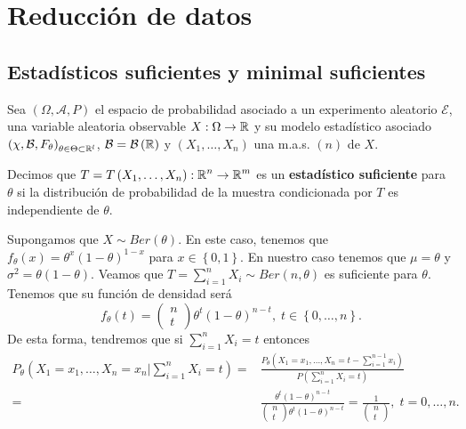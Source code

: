 \chapter{Reducción de datos}
\section{Estadísticos suficientes y minimal suficientes}

Sea $\displaystyle \left(\Omega, \mathcal{A}, P \right) $ el espacio de probabilidad asociado a un experimento aleatorio $\displaystyle \mathcal{E} $, una variable aleatoria observable $\displaystyle X : \Omega \to \mathbb{R} $ y su modelo estadístico asociado $\displaystyle \left(\chi, \mathcal{B}, F_{\theta }\right)_{\theta \in \Theta \subset \mathbb{R}^{l}} $, $\displaystyle \mathcal{B}=\mathcal{B}\left(\mathbb{R}\right) $ y $\displaystyle \left(X_{1}, \ldots, X_{n}\right) $ una m.a.s. $\displaystyle \left(n\right) $ de $\displaystyle X $.
\begin{definition}
Decimos que $\displaystyle T = T\left(X_{1}, \ldots, X_{n}\right) : \mathbb{R}^{n} \to \mathbb{R}^{m} $ es un \textbf{estadístico suficiente} para $\displaystyle \theta  $ si la distribución de probabilidad de la muestra condicionada por $\displaystyle T $ es independiente de $\displaystyle \theta  $. 
\end{definition}
\begin{eg}
	Supongamos que $\displaystyle X\sim Ber\left(\theta\right) $. En este caso, tenemos que $\displaystyle f_{\theta}\left(x\right)=\theta^{x}\left(1-\theta\right)^{1-x} $ para $\displaystyle x \in \left\{ 0,1\right\}  $. En nuestro caso tenemos que $\displaystyle \mu= \theta $ y $\displaystyle \sigma^{2} = \theta\left(1-\theta \right) $. Veamos que $\displaystyle T = \sum^{n}_{i = 1}X_{i}\sim Ber\left(n, \theta\right) $ es suficiente para $\displaystyle \theta $. Tenemos que su función de densidad será 
	\[f_{\theta }\left(t\right)=\begin{pmatrix} n \\ t \end{pmatrix}\theta^{t}\left(1-\theta\right)^{n-t}, \; t \in \left\{ 0, \ldots, n\right\}  .\]
De esta forma, tendremos que si $\displaystyle \sum^{n}_{i=1}X_{i} = t $ entonces
\[
\begin{split}
	P_{\theta}\left(X_{1}=x_{1}, \ldots, X_{n}=x_{n}|\sum^{n}_{i=1}X_{i}=t\right) = &\frac{P_{\theta}\left(X_{1}=x_{1}, \ldots, X_{n}=t - \sum^{n-1}_{i = 1}x_{i}\right)}{P\left(\sum^{n}_{i=1}X_{i}=t\right)} \\
	= & \frac{\theta^{t}\left(1-\theta\right)^{n-t}}{\begin{pmatrix} n \\ t \end{pmatrix}\theta^{t}\left(1-\theta\right)^{n-t}}=\frac{1}{\begin{pmatrix} n\\ t \end{pmatrix}}, \; t = 0, \ldots, n.
\end{split}
\]
\end{eg}
